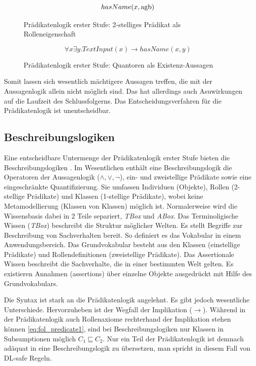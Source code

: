 \documentclass[runningheads,a4paper]{llncs}
\begin{document}
\begin{figure}
\begin{equation}
hasName(x, \textnormal{agb})
\label{eq:fol_predicate2}
\end{equation}
\caption{Prädikatenlogik erster Stufe: 2-stelliges Prädikat als Rolleneigenschaft}
\end{figure}

\begin{figure}
\begin{equation}
\forall x\exists y. TextInput(x) \to hasName(x, y)
\label{eq:fol_quantors}
\end{equation}
\caption{Prädikatenlogik erster Stufe: Quantoren als Existenz-Aussagen}
\end{figure}

Somit lassen sich wesentlich mächtigere Aussagen treffen, die mit der Aussagenlogik allein nicht möglich sind.
Das hat allerdings auch Asuwirkungen auf die Laufzeit des Schlussfolgerns.
Das Entscheidungsverfahren für die Prädikatenlogik ist unentscheidbar. 
\\

\subsection{Beschreibungslogiken}
\label{sec:desclogic}

Eine entscheidbare Untermenge der Prädikatenlogik erster Stufe bieten die Beschreibungslogiken \cite{foundations}.
Im Wesentlichen enthält eine Beschreibungslogik die Operatoren der Aussagenlogik (\(\land, \lor, \neg\)), ein- und zweistellige Prädikate sowie eine eingeschränkte Quantifizierung.
Sie umfassen Individuen (Objekte), Rollen (2-stellige Prädikate) und Klassen (1-stellige Prädikate), wobei keine Metamodellierung (Klassen von Klassen) möglich ist.
Normalerweise wird die Wissensbasis dabei in 2 Teile separiert, \textit{TBox} und \textit{ABox}. 
Das Terminoligische Wissen (\textit{TBox}) beschreibt die Struktur möglicher Welten. 
Es stellt Begriffe zur Beschreibung von Sachverhalten bereit. 
So definiert es das Vokabular in einem Anwendungsbereich. 
Das Grundvokabular besteht aus den Klassen (einstellige Prädikate) und Rollendefinitionen (zweistellige Prädikate). 
Das Assertionale Wissen beschreibt die Sachverhalte, die in einer bestimmten Welt gelten. 
Es existieren Annahmen (assertions) über einzelne Objekte ausgedrückt mit
Hilfe des Grundvokabulars.

Die Syntax ist stark an die Prädikatenlogik angelehnt. 
Es gibt jedoch wesentliche Unterschiede. 
Hervorzuheben ist der Wegfall der Implikation (\(\to\)). 
Während in der Prädikatenlogik auch Rollenaxiome rechterhand der Implikation stehen können \eqref{eq:fol_predicate1}, sind bei Beschreibungslogiken nur Klassen in Subsumptionen möglich \(C_1 \sqsubseteq C_2\).
Nur ein Teil der Prädikatenlogik ist demnach adäquat in eine Beschreibungslogik zu übersetzen, man spricht in diesem Fall von DL-safe Regeln. 
\end{document}
